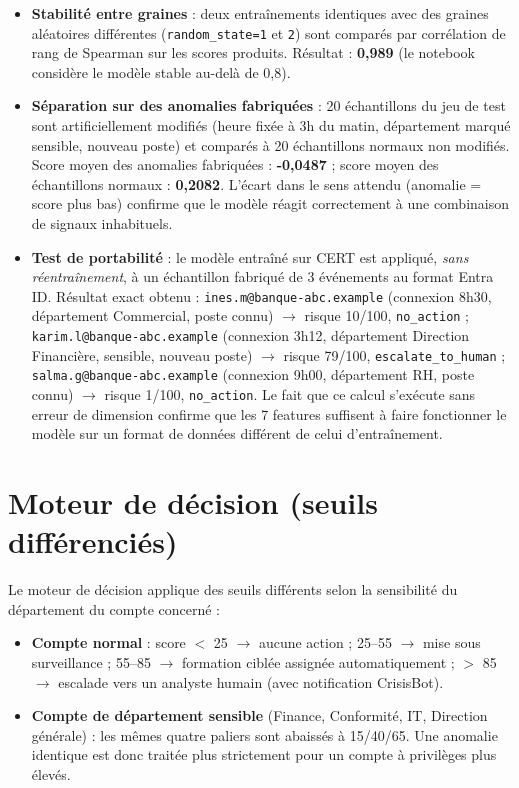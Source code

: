 \documentclass[12pt,a4paper]{report}
\begin{document}
\begin{itemize}[nosep]
\item \textbf{Stabilité entre graines} : deux entraînements identiques avec des graines aléatoires différentes (\texttt{random\_state=1} et \texttt{2}) sont comparés par corrélation de rang de Spearman sur les scores produits. Résultat : \textbf{0,989} (le notebook considère le modèle stable au-delà de 0,8).
\item \textbf{Séparation sur des anomalies fabriquées} : 20 échantillons du jeu de test sont artificiellement modifiés (heure fixée à 3h du matin, département marqué sensible, nouveau poste) et comparés à 20 échantillons normaux non modifiés. Score moyen des anomalies fabriquées : \textbf{-0,0487} ; score moyen des échantillons normaux : \textbf{0,2082}. L'écart dans le sens attendu (anomalie = score plus bas) confirme que le modèle réagit correctement à une combinaison de signaux inhabituels.
\item \textbf{Test de portabilité} : le modèle entraîné sur CERT est appliqué, \emph{sans réentraînement}, à un échantillon fabriqué de 3 événements au format Entra ID. Résultat exact obtenu : \texttt{ines.m@banque-abc.example} (connexion 8h30, département Commercial, poste connu) $\rightarrow$ risque 10/100, \texttt{no\_action} ; \texttt{karim.l@banque-abc.example} (connexion 3h12, département Direction Financière, sensible, nouveau poste) $\rightarrow$ risque 79/100, \texttt{escalate\_to\_human} ; \texttt{salma.g@banque-abc.example} (connexion 9h00, département RH, poste connu) $\rightarrow$ risque 1/100, \texttt{no\_action}. Le fait que ce calcul s'exécute sans erreur de dimension confirme que les 7 features suffisent à faire fonctionner le modèle sur un format de données différent de celui d'entraînement.
\end{itemize}

\section{Moteur de décision (seuils différenciés)}

Le moteur de décision applique des seuils différents selon la sensibilité du département du compte concerné :

\begin{itemize}[nosep]
\item \textbf{Compte normal} : score $<$ 25 $\rightarrow$ aucune action ; 25--55 $\rightarrow$ mise sous surveillance ; 55--85 $\rightarrow$ formation ciblée assignée automatiquement ; $>$ 85 $\rightarrow$ escalade vers un analyste humain (avec notification CrisisBot).
\item \textbf{Compte de département sensible} (Finance, Conformité, IT, Direction générale) : les mêmes quatre paliers sont abaissés à 15/40/65. Une anomalie identique est donc traitée plus strictement pour un compte à privilèges plus élevés.
\end{itemize}
\end{document}
